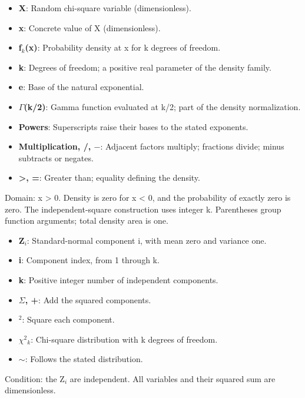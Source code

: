 \documentclass[11pt,a4paper]{article}
\begin{document}
\begin{samepage}
\begin{itemize}\setlength{\itemsep}{1pt}\setlength{\parsep}{0pt}
\item \textbf{X}: Random chi-square variable (dimensionless).
\item \textbf{x}: Concrete value of X (dimensionless).
\item \textbf{f\ensuremath{{}_k}(x)}: Probability density at x for k degrees of freedom.
\item \textbf{k}: Degrees of freedom; a positive real parameter of the density family.
\item \textbf{e}: Base of the natural exponential.
\item \textbf{\ensuremath{\Gamma}(k/2)}: Gamma function evaluated at k/2; part of the density normalization.
\item \textbf{Powers}: Superscripts raise their bases to the stated exponents.
\item \textbf{Multiplication, /, \ensuremath{-}}: Adjacent factors multiply; fractions divide; minus subtracts or negates.
\item \textbf{>, =}: Greater than; equality defining the density.
\end{itemize}

Domain: x > 0. Density is zero for x < 0, and the probability of exactly zero is zero. The independent-square construction uses integer k. Parentheses group function arguments; total density area is one.

\begin{itemize}\setlength{\itemsep}{1pt}\setlength{\parsep}{0pt}
\item \textbf{Z\ensuremath{{}_i}}: Standard-normal component i, with mean zero and variance one.
\item \textbf{i}: Component index, from 1 through k.
\item \textbf{k}: Positive integer number of independent components.
\item \textbf{\ensuremath{\Sigma}, +}: Add the squared components.
\item \textbf{\ensuremath{{}^2}}: Square each component.
\item \textbf{\ensuremath{\chi}\ensuremath{{}^2}\ensuremath{{}_k}}: Chi-square distribution with k degrees of freedom.
\item \textbf{\ensuremath{\sim}}: Follows the stated distribution.
\end{itemize}

Condition: the Z\ensuremath{{}_i} are independent. All variables and their squared sum are dimensionless.

\end{samepage}
\medskip
\end{document}
